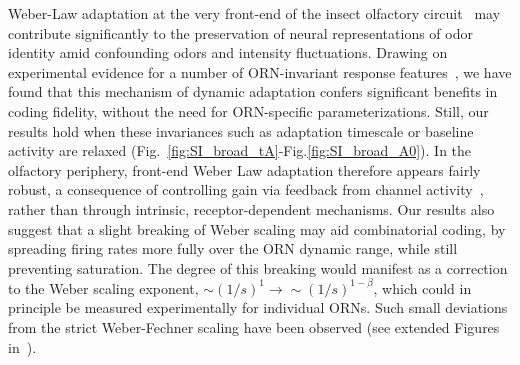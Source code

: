 \documentclass[10pt,prl,aps,showpacs,twocolumn,unsortedaddress,showkeys,linenumbers]{revtex4-1}
\begin{document}
Weber-Law adaptation at the very front-end of the insect olfactory circuit~\cite{srinivas_elife,cafaro_WL,cao_WL} may contribute significantly to the preservation of neural representations of odor identity amid confounding odors and intensity fluctuations. Drawing on experimental evidence for a number of ORN-invariant response features~\cite{nagel_wilson_biophysical,martelli,stevens,srinivas_elife,si2017invariances}, we have found that this mechanism of dynamic adaptation confers significant benefits in coding fidelity, without the need for ORN-specific parameterizations. Still, our results hold when these invariances such as adaptation timescale or baseline activity are relaxed (Fig.~\ref{fig:SI_broad_tA}-Fig.\ref{fig:SI_broad_A0}). In the olfactory periphery, front-end Weber Law adaptation therefore appears fairly robust, a consequence of controlling gain via feedback from channel activity~\cite{EmonetReview,nagel_wilson_biophysical,srinivas_elife}, rather than through intrinsic, receptor-dependent mechanisms. 
{\color {blue} 
Our results also suggest that a slight breaking of Weber scaling may aid combinatorial coding, by spreading firing rates more fully over the ORN dynamic range, while still preventing saturation. The degree of this breaking would manifest as a correction to the Weber scaling exponent, $\sim (1/s)^1 \rightarrow \sim (1/s)^{1-\beta}$, which could in principle be measured experimentally for individual ORNs. Such small deviations from the strict Weber-Fechner scaling have been observed (see extended Figures in~\cite{srinivas_elife}).
}
\end{document}
